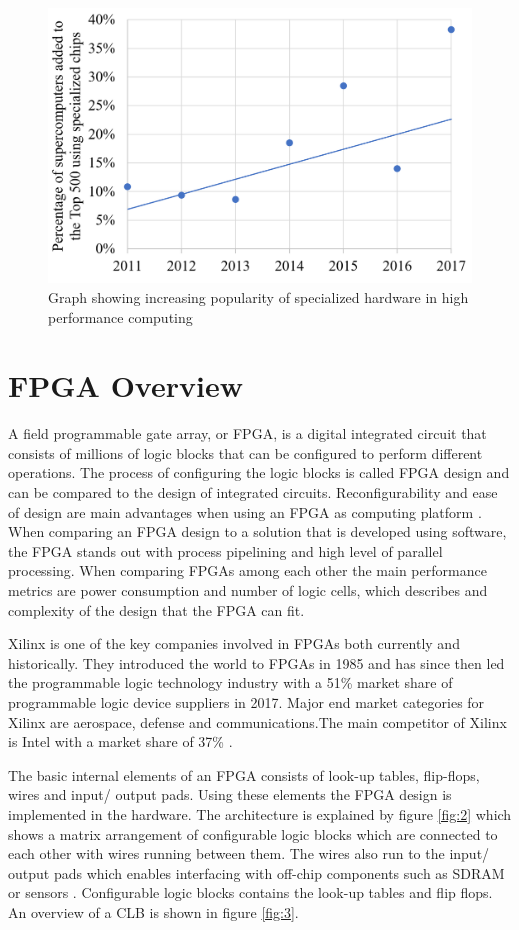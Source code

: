 \documentclass[12pt]{report}
\begin{document}
\begin{figure}
    \centering
    \includegraphics[scale=0.4]{figures/Supercomputers-with-pecialized-chips.png}
    \caption{Graph showing increasing popularity of 
specialized hardware in high performance computing \citep{GenPurpTech}}
    \label{fig:1}
\end{figure}

\section{FPGA Overview}
A field programmable gate array, or FPGA, is a digital integrated circuit that consists of millions of logic blocks that can be configured to perform different operations. The process of configuring the logic blocks is called FPGA design and can be compared to the design of integrated circuits. Reconfigurability and ease of design are main advantages when using an FPGA as computing platform \citep{XilFPGAIntro}. When comparing an FPGA design to a solution that is developed using software, the FPGA stands out with process pipelining and high level of parallel processing. When comparing FPGAs among each other the main performance metrics are power consumption and number of logic cells, which describes and complexity of the design that the FPGA can fit. 
\par
Xilinx is one of the key companies involved in FPGAs both currently and historically. They introduced the world to FPGAs in 1985 and has since then led the programmable logic technology industry with a 51\% market share of programmable logic device suppliers in 2017. Major end market categories for Xilinx are aerospace, defense and communications.The main competitor of Xilinx is Intel with a market share of 37\% \citep{XilHist}\citep{XilShare}.
\par
The basic internal elements of an FPGA consists of look-up tables, flip-flops, wires and input/ output pads. Using these elements the FPGA design is implemented in the hardware.
The architecture is explained by figure \ref{fig:2} which shows a matrix arrangement of configurable logic blocks which are connected to each other with wires running between them. The wires also run to the input/ output pads which enables interfacing with off-chip components such as SDRAM or sensors \citep{XilFPGAArch}. Configurable logic blocks contains the look-up tables and flip flops. An overview of a CLB is shown in figure \ref{fig:3}.
\end{document}
